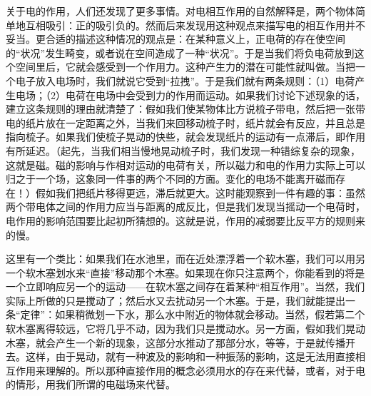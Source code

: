 \documentclass[12pt,oneside]{book}
\begin{document}
\begin{common-format}
关于电的作用，人们还发现了更多事情。对电相互作用的自然解释是，两个物体简单地互相吸引：正的吸引负的。然而后来发现用这种观点来描写电的相互作用并不妥当。更合适的描述这种情况的观点是：在某种意义上，正电荷的存在使空间的“状况”发生畸变，或者说在空间造成了一种“状况”。于是当我们将负电荷放到这个空间里后，它就会感受到一个作用力。这种产生力的潜在可能性就叫做。当把一个电子放入电场时，我们就说它受到“拉拽”。于是我们就有两条规则：（1）电荷产生电场；（2）电荷在电场中会受到力的作用而运动。如果我们讨论下述现象的话，建立这条规则的理由就清楚了：假如我们使某物体比方说梳子带电，然后把一张带电的纸片放在一定距离之外，当我们来回移动梳子时，纸片就会有反应，并且总是指向梳子。如果我们使梳子晃动的快些，就会发现纸片的运动有一点滞后，即作用有所延迟。（起先，当我们相当慢地晃动梳子时，我们发现一种错综复杂的现象，这就是磁。磁的影响与作相对运动的电荷有关，所以磁力和电的作用力实际上可以归之于一个场，这象同一件事的两个不同的方面。变化的电场不能离开磁而存在！）假如我们把纸片移得更远，滞后就更大。这时能观察到一件有趣的事：虽然两个带电体之间的作用力应当与距离的成反比，但是我们发现当摇动一个电荷时，电作用的影响范围要比起初所猜想的。这就是说，作用的减弱要比反平方的规则来的慢。

这里有一个类比：如果我们在水池里，而在近处漂浮着一个软木塞，我们可以用另一个软木塞划水来“直接”移动那个木塞。如果现在你只注意两个，你能看到的将是一个立即响应另一个的运动——在软木塞之间存在着某种“相互作用”。当然，我们实际上所做的只是搅动了；然后水又去扰动另一个木塞。于是，我们就能提出一条“定律”：如果稍微划一下水，那么水中附近的物体就会移动。当然，假若第二个软木塞离得较远，它将几乎不动，因为我们只是搅动水。另一方面，假如我们晃动木塞，就会产生一个新的现象，这部分水推动了那部分水，等等，于是就传播开去。这样，由于晃动，就有一种波及的影响和一种振荡的影响，这是无法用直接相互作用来理解的。所以那种直接作用的概念必须用水的存在来代替，或者，对于电的情形，用我们所谓的电磁场来代替。


\end{common-format}
\end{document}
